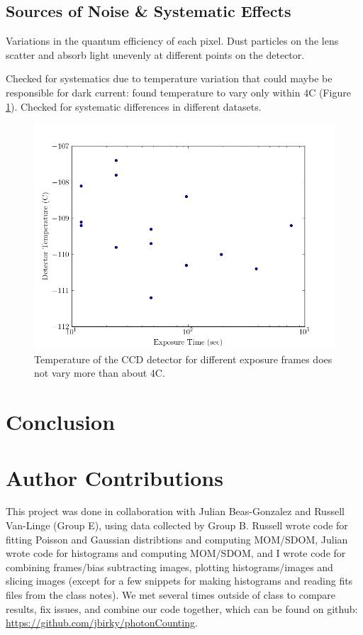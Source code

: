 \documentclass[preprint]{aastex62}
\begin{document}
\subsection{Sources of Noise \& Systematic Effects}
Variations in the quantum efficiency of each pixel.
Dust particles on the lens scatter and absorb light unevenly at different points on the detector.

Checked for systematics due to temperature variation that could maybe be responsible for dark current: found temperature to vary only within 4C (Figure \ref{fig:temp}). Checked for systematic differences in different datasets. 

\begin{figure}[ht]
\begin{center}
\includegraphics[width=.48\linewidth]{plots/exposure_temp.png}
\caption{Temperature of the CCD detector for different exposure frames does not vary more than about 4C.} \label{fig:temp}
\end{center}
\end{figure}

\section{Conclusion}

\section{Author Contributions}

This project was done in collaboration with Julian Beas-Gonzalez and Russell Van-Linge (Group E), using data collected by Group B. Russell wrote code for fitting Poisson and Gaussian distribtions and computing MOM/SDOM, Julian wrote code for histograms and computing MOM/SDOM, and I wrote code for combining frames/bias subtracting images, plotting histograms/images and slicing images (except for a few snippets for making histograms and reading fits files from the class notes). We met several times outside of class to compare results, fix issues, and combine our code together, which can be found on github: \href{https://github.com/jbirky/photonCounting}{https://github.com/jbirky/photonCounting}.
\end{document}
